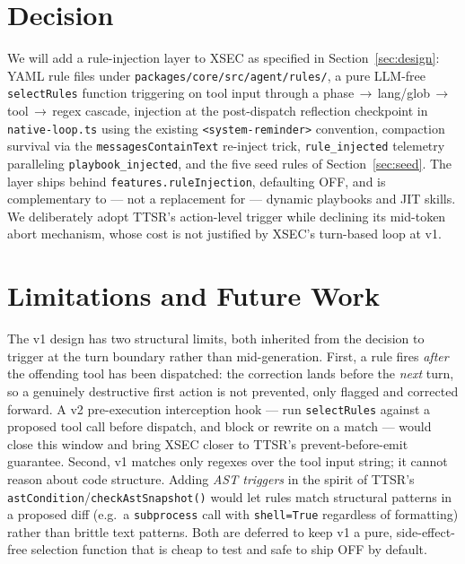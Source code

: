 \documentclass[11pt]{article}
\begin{document}
\section{Decision}
\label{sec:decision}

We will add a rule-injection layer to XSEC as specified in
Section~\ref{sec:design}: YAML rule files under
\texttt{packages/core/src/agent/rules/}, a pure LLM-free \texttt{selectRules}
function triggering on tool input through a phase\,$\rightarrow$\,lang/glob\,$\rightarrow$\,tool\,$\rightarrow$\,regex
cascade, injection at the post-dispatch reflection checkpoint in
\texttt{native-loop.ts} using the existing \texttt{<system-reminder>} convention,
compaction survival via the \texttt{messagesContainText} re-inject trick,
\texttt{rule\_injected} telemetry paralleling \texttt{playbook\_injected}, and the
five seed rules of Section~\ref{sec:seed}. The layer ships behind
\texttt{features.ruleInjection}, defaulting OFF, and is complementary to --- not a
replacement for --- dynamic playbooks and JIT skills. We deliberately adopt
TTSR's action-level trigger while declining its mid-token abort mechanism, whose
cost is not justified by XSEC's turn-based loop at v1.

\section{Limitations and Future Work}
\label{sec:future}

The v1 design has two structural limits, both inherited from the decision to
trigger at the turn boundary rather than mid-generation. First, a rule fires
\emph{after} the offending tool has been dispatched: the correction lands before
the \emph{next} turn, so a genuinely destructive first action is not prevented,
only flagged and corrected forward. A v2 pre-execution interception hook --- run
\texttt{selectRules} against a proposed tool call before dispatch, and block or
rewrite on a match --- would close this window and bring XSEC closer to TTSR's
prevent-before-emit guarantee. Second, v1 matches only regexes over the tool
input string; it cannot reason about code structure. Adding \emph{AST triggers}
in the spirit of TTSR's \texttt{astCondition}/\texttt{checkAstSnapshot()} would
let rules match structural patterns in a proposed diff (e.g.\ a
\texttt{subprocess} call with \texttt{shell=True} regardless of formatting)
rather than brittle text patterns. Both are deferred to keep v1 a pure,
side-effect-free selection function that is cheap to test and safe to ship OFF by
default.
\end{document}
